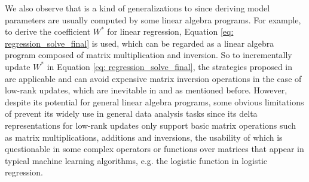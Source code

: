 We also observe that \cite{nikolic2014linview} is a kind of generalizations to \cite{deshpande2006mauvedb, gupta2015processing} since deriving model parameters are usually computed by some linear algebra programs. For example, to derive the coefficient $W^*$ for linear regression, Equation \ref{eq: regression_solve_final} is used, which can be regarded as a linear algebra program composed of matrix multiplication and inversion. So to incrementally update $W^*$ in Equation \ref{eq: regression_solve_final}, the strategies proposed in \cite{nikolic2014linview} are applicable and can avoid expensive matrix inversion operations in the case of low-rank updates, which are inevitable in \cite{deshpande2006mauvedb} and \cite{gupta2015processing} as mentioned before. However, despite its potential for general linear algebra programs, some obvious limitations of \cite{nikolic2014linview} prevent its widely use in general data analysis tasks since its delta representations for low-rank updates only support basic matrix operations such as matrix multiplications, additions and inversions, the usability of which is questionable in some complex operators or functions over matrices that appear in typical machine learning algorithms, e.g. the logistic function in logistic regression.